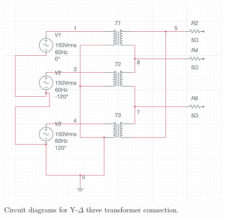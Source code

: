 \begin{figure}[htbp!]
    \centering
    \includegraphics[width=.8\linewidth]{images/output/ydel.png}
    \caption{Circuit diagrams for Y-$\Delta$ three transformer connection.}
    \label{fig:fig}
\end{figure}
\vspace{\fill}